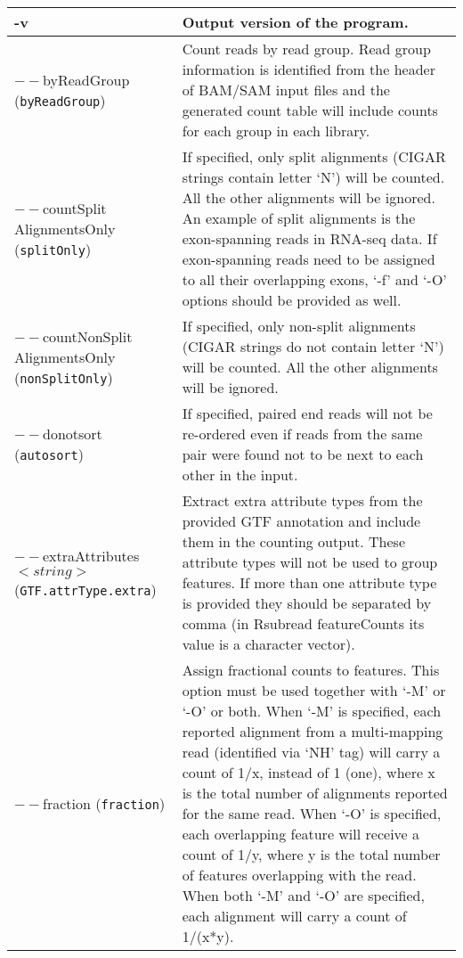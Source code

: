 \documentclass[12pt]{report}
\newcommand{\code}[1]{{\small\texttt{#1}}}
\newcommand{\Rsubread}{\textsf{Rsubread}}
\newcommand{\featureCounts}{\textsf{featureCounts}}
\begin{document}
\begin{longtable}{|p{5cm}|p{11cm}|}
\hline
-v & Output version of the program. \\
\hline
$--$byReadGroup \newline (\code{byReadGroup}) & Count reads by read group. Read group information is identified from the header of BAM/SAM input files and the generated count table will include counts for each group in each library.\\
\hline
$--$countSplit \newline AlignmentsOnly \newline (\code{splitOnly}) & If specified, only split alignments (CIGAR strings contain letter `N') will be counted. All the other alignments will be ignored. An example of split alignments is the exon-spanning reads in RNA-seq data. If exon-spanning reads need to be assigned to all their overlapping exons, `-f' and `-O' options should be provided as well.\\
\hline
$--$countNonSplit  \newline AlignmentsOnly \newline (\code{nonSplitOnly}) & If specified, only non-split alignments (CIGAR strings do not contain letter `N') will be counted. All the other alignments will be ignored.\\
\hline
$--$donotsort \newline (\code{autosort}) & If specified, paired end reads will not be re-ordered even if reads from the same pair were found not to be next to each other in the input.\\
\hline
$--$extraAttributes $<string>$ \newline (\code{GTF.attrType.extra}) & Extract extra attribute types from the provided GTF annotation and include them in the counting output. These attribute types will not be used to group features. If more than one attribute type is provided they should be separated by comma (in {\Rsubread} {\featureCounts} its value is a character vector).  \\
\hline
$--$fraction \newline (\code{fraction}) & Assign fractional counts to features. This option must be used together with `-M' or `-O' or both. When `-M' is specified, each reported alignment from a multi-mapping read (identified via `NH' tag) will carry a count of 1/x, instead of 1 (one), where x is the total number of alignments reported for the same read. When `-O' is specified, each overlapping feature will receive a count of 1/y, where y is the total number of features overlapping with the read. When both `-M' and `-O' are specified, each alignment will carry a count of 1/(x*y).\\

\end{longtable}
\end{document}
